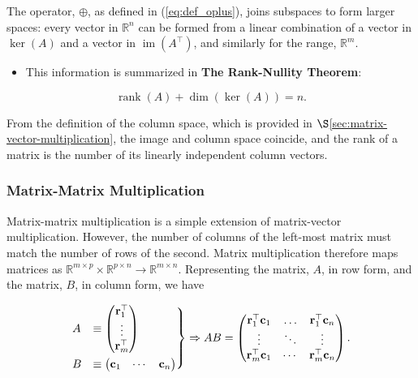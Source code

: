 \documentclass[12pt, twoside, draft]{article}
\begin{document}
The operator, $\oplus$, as defined in (\ref{eq:def_oplus}), joins subspaces to form larger spaces: every vector in $\mathbb{R}^n$ can be formed from a linear combination of a vector in $\ker(A)$ and a vector in $\operatorname{im}(A^\top)$, and similarly for the range, $\mathbb{R}^m$.

\begin{itemize}
\item This information is summarized in \textbf{The Rank-Nullity Theorem}:
\end{itemize}
\begin{equation}\label{eq:rank_nullity_theorem}
\operatorname{rank}(A) + \dim(\ker(A)) = n .
\end{equation}

From the definition of the column space, which is provided in $\S$\ref{sec:matrix-vector-multiplication}, the image and column space coincide, and the rank of a matrix is the number of its linearly independent column vectors.

\subsubsection{Matrix-Matrix Multiplication}\label{sec:matrix-matrix-multiplication}
Matrix-matrix multiplication is a simple extension of matrix-vector multiplication.  However, the number of columns of the left-most matrix must match the number of rows of the second.  Matrix multiplication therefore maps matrices as $\mathbb{R}^{m \times p} \times \mathbb{R}^{p \times n} \rightarrow \mathbb{R}^{m \times n}$.  Representing the matrix, $A$, in row form, and the matrix, $B$, in column form, we have

\begin{equation}\label{eq:matrix_matrix_multiplication}
\begin{rcases}
A & \equiv \begin{pmatrix}
\mathbf{r}_1^\top \\
\vdots \\
\mathbf{r}_m^\top
\end{pmatrix} \\
B & \equiv \begin{pmatrix}
\mathbf{c}_1 & \cdots & \mathbf{c}_n 
\end{pmatrix}
\end{rcases}
\Rightarrow
AB = \begin{pmatrix} \mathbf{r}_1^\top \mathbf{c}_1 & \ldots & \mathbf{r}_1^\top \mathbf{c}_n \\
\vdots & \ddots & \vdots \\
\mathbf{r}_m^\top \mathbf{c}_1 & \cdots & \mathbf{r}_m^\top \mathbf{c}_n
\end{pmatrix}.
\end{equation}
\end{document}
